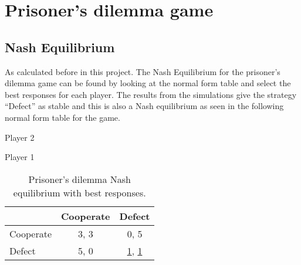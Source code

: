 \label{app:nashess}
\section{Prisoner's dilemma game}
\label{app:pdnashess}

\subsection{Nash Equilibrium}
As calculated before in this project. The Nash Equilibrium for the prisoner's dilemma game can be found by looking at the normal form table and select the best responses for each player. The results from the simulations give the strategy ``Defect'' as stable and this is also a Nash equilibrium as seen in the following normal form table for the game.

\begin{table}[H]
\begin{center}
Player 2

Player 1
\begin{tabular}{|l|c|c|}
\hline
 & Cooperate & Defect\\ 
\hline
Cooperate & 3, 3 & 0, 5\\
\hline
Defect & 5, 0 & \underline{1}, \underline{1}\\
\hline
\end{tabular}

\caption{ Prisoner's dilemma Nash equilibrium with best responses.}
\label{fig:pdnashbr}	
\end{center}
\end{table}


